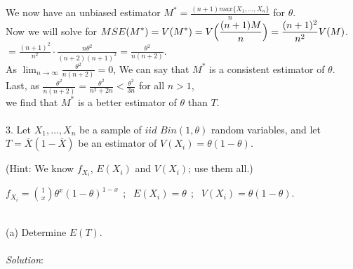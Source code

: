 \documentclass[12pt]{article}
\newcommand{\XB}{\color{black}}
\newcommand{\XBB}{\color{blue}}
\begin{document}
\noindent
We now have an unbiased estimator $ \displaystyle M^{*} = \frac{(n + 1)max\{X_{1},...,X_{n}\}}{n} $ for $ \theta $. \\

\noindent
Now we will solve for $ \displaystyle MSE(M^{*}) = V(M^{*}) = V\Bigl( \frac{(n + 1)M}{n} \Bigr) = \frac{(n + 1)^{2}}{n^{2}} V(M) $. \\

$ \displaystyle = \frac{(n + 1)^{2}}{n^{2}} \cdot \frac{n\theta^{2}}{(n + 2)(n + 1)^{2}} = \frac{\theta^{2}}{n(n + 2)} $. \\

\noindent
As $ \displaystyle \lim_{n \to \infty} \frac{\theta^{2}}{n(n + 2)} = 0 $, We can say that $ M^{*} $ is a consistent estimator of $ \theta $. \\

Last, as $ \displaystyle \frac{\theta^{2}}{n(n + 2)} = \frac{\theta^{2}}{n^{2} + 2n} < \frac{\theta^{2}}{3n} $ for all $ n > 1 $, \\

we find that $ M^{*} $ is a better estimator of $ \theta $ than $ T $. \\

\newpage
\XBB\hrulefill\XB \\

3. Let $ X_{1}, \dots, X_{n} $ be a sample of $ iid $ $ Bin(1, \theta) $ random variables, and let $ T = \overline{X}(1 - \overline{X}) $ be an estimator of $ V(X_{i}) = \theta(1 - \theta) $.

(Hint: We know $ f_{X_{i}} $, $ E(X_{i}) $ and $ V(X_{i}) $; use them all.) \\

\begin{center}
    $ \displaystyle f_{X_{i}} = \binom{1}{x} \theta^{x}(1 - \theta)^{1-x} \ \ $;
    $ \ \ E(X_{i}) =  \theta \ \ $;
    $ \ \ V(X_{i}) =  \theta(1 - \theta) $.
\end{center}

\XBB\hrulefill\XB
\vspace{5mm} \\

(a) Determine $ E(T) $. \\
\vspace{2.5mm} \\
\textit{Solution}:
\vspace{2.5mm} \\
\end{document}
